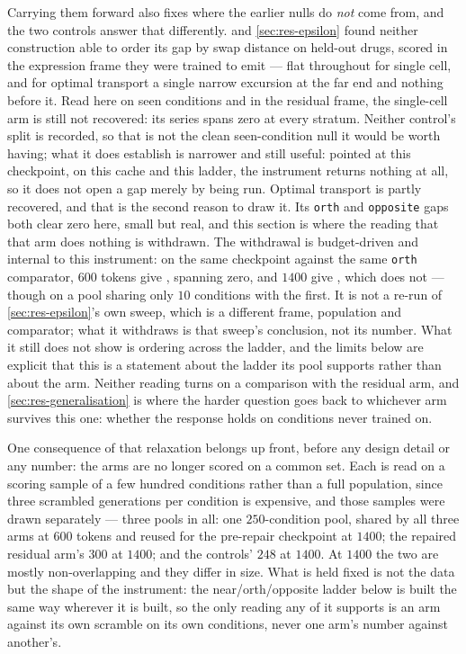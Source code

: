 Carrying them forward also fixes where the earlier nulls do \emph{not} come from,
and the two controls answer that differently.  and
\cref{sec:res-epsilon} found neither construction able to order its gap by swap
distance on held-out drugs, scored in the expression frame they were trained to
emit --- flat throughout for single cell, and for optimal transport a single
narrow excursion at the far end and nothing before it. Read here on seen conditions and
in the residual frame, the single-cell arm is still not recovered: its series spans zero
at every stratum. Neither control's split is recorded, so that is not the clean
seen-condition null it would be worth having; what it does establish is narrower
and still useful: pointed at this checkpoint, on this cache and this ladder, the
instrument returns nothing at all, so it does not open a gap merely by being run. Optimal
transport is partly recovered, and that is the second reason to draw it. Its
\texttt{orth} and \texttt{opposite} gaps both clear zero here, small but real, and
this section is where the reading that that arm does nothing is withdrawn. The
withdrawal is budget-driven and internal to this instrument: on the same
checkpoint against the same \texttt{orth} comparator, $600$ tokens give
, spanning zero, and $1400$ give
, which does not --- though on a pool sharing only
$\num{10}$ conditions with the first. It is not a re-run of
\cref{sec:res-epsilon}'s own sweep, which is a different frame, population and
comparator; what it withdraws is that sweep's conclusion, not its number. What it still does not show is ordering across the
ladder, and the limits below are explicit that this is a statement
about the ladder its pool supports rather than about the arm. Neither reading
turns on a comparison with the residual arm, and
\cref{sec:res-generalisation} is where the harder question goes back to whichever
arm survives this one: whether the response holds on conditions never trained
on.

One consequence of that relaxation belongs up front, before any design detail or
any number: the arms are no longer scored on a common set. Each is read on a
scoring sample of a few hundred conditions rather than a full population, since
three scrambled generations per condition is expensive, and those samples were
drawn separately --- three pools in all: one $\num{250}$-condition pool, shared by
all three arms at $600$ tokens and reused for the pre-repair checkpoint at
$1400$; the repaired residual arm's $\num{300}$ at $1400$; and the controls'
$\num{248}$ at $1400$. At $1400$ the two are mostly non-overlapping
and they differ in size. What is held fixed is not the
data but the shape of the instrument: the near/orth/opposite ladder below is
built the same way wherever it is built, so the only reading any of it supports
is an arm against its own scramble on its own conditions, never one arm's number
against another's.

